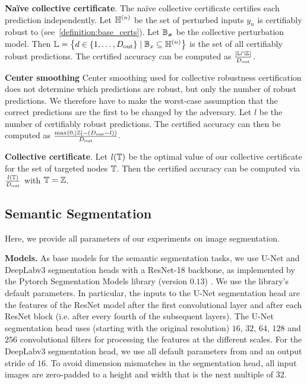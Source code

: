 \textbf{Na\"ive collective certificate}. The na\"ive collective certificate certifies each prediction independently. Let ${\mathbb{H}}^{(n)}$ be the set of perturbed inputs $y_n$ is certifiably robust to (see~\cref{definition:base_certs}). Let ${\mathbb{B}}_{\bm{x}}$ be the collective perturbation model.
Then ${\mathbb{L}} = \left\{d \in \{1,\dots,D_\mathrm{out}\} \mid {\mathbb{B}}_x \subseteq {\mathbb{H}}^{(n)} \right\}$ is the set of all certifiably robust predictions.
The  certified accuracy can be computed as 
$\frac{|{\mathbb{L}} \cap {\mathbb{Z}}|}{D_\mathrm{out}}$.

\textbf{Center smoothing} Center smoothing used for collective robustness certification does not determine which predictions are robust, but only the number of robust predictions.
We therefore have to make the worst-case assumption that the correct predictions are the first to be changed by the adversary.
Let $l$ be the number of certifiably robust predictions. 
The certified accuracy can then be computed as $\frac{\max\left(0, |{\mathbb{Z}}| - \left(D_\mathrm{out} - l\right)\right)}{D_\mathrm{out}}$.

\textbf{Collective certificate}. Let $l({\mathbb{T}})$ be the optimal value of our collective certificate for the set of targeted nodes ${\mathbb{T}}$. Then the certified accuracy can be computed via $\frac{l({\mathbb{T}})}{D_\mathrm{out}}$ with ${\mathbb{T}} =  {\mathbb{Z}}$.

\subsection{Semantic Segmentation}\label{sec-detailed-exp-setup-segmentation}
Here, we provide  all parameters of our experiments on image segmentation.

\textbf{Models.} As base models for the semantic segmentation tasks, we use U-Net \citep{Ronneberger2015} and DeepLabv3 \citep{Chen2017} segmentation heads with a ResNet-18 \citep{He2016} backbone, as implemented by the Pytorch Segmentation Models library (version $0.13$) \citep{Yakubovskiy2019}.
We use the library's default parameters. In particular, the inputs to the U-Net segmentation head are the features of the ResNet model after the first convolutional layer and after each ResNet block (i.e. after every fourth of the subsequent layers).
The U-Net segmentation head uses (starting with the original resolution) $16$, $32$, $64$, $128$ and $256$ convolutional filters for processing the features at the different scales.
For the DeepLabv3 segmentation head, we use all default parameters from \citet{Chen2017} and an output stride of $16$.
To avoid dimension mismatches in the segmentation head, all input images are zero-padded to a height and width that is the next multiple of $32$.


